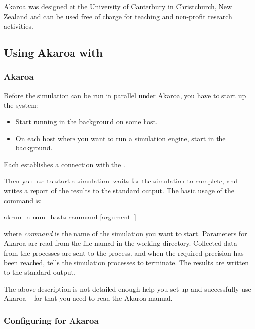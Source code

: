 Akaroa was designed at the University of Canterbury in Christchurch, New Zealand
and can be used free of charge for teaching and non-profit research activities.


\subsection{Using Akaroa with {\opp}}

\subsubsection{Akaroa}

Before the simulation can be run in parallel under Akaroa, you have to
start up the system:

\begin{itemize}
  \item{Start  running in the background on some host.}
  \item{On each host where you want to run a simulation engine,
     start  in the background.}
\end{itemize}

Each  establishes a connection with the .

Then you use  to start a simulation.  waits
for the simulation to complete, and writes a report of the results
to the standard output. The basic usage of the  command is:

\begin{commandline}
akrun -n num_hosts command [argument..]
\end{commandline}

where \textit{command} is the name of the simulation you want to start.
Parameters for Akaroa are read from the file named  in
the working directory. Collected data from the processes are
sent to the  process, and when the required precision
has been reached,  tells the simulation processes to
terminate. The results are written to the standard output.

The above description is not detailed enough help you
set up and successfully use Akaroa -- for that you need to read the
Akaroa manual.

\subsubsection{Configuring {\opp} for Akaroa}

